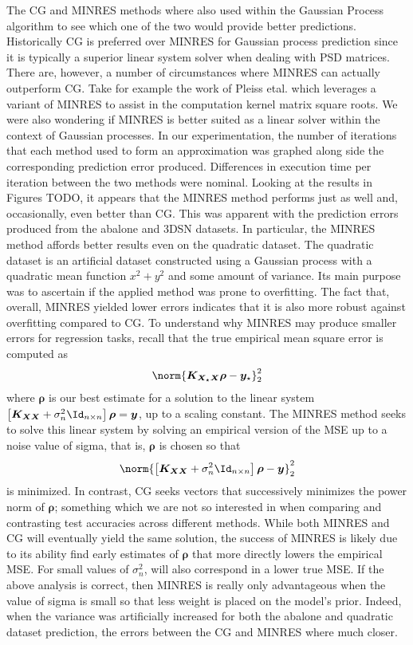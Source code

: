 The CG and MINRES methods where also used within the Gaussian Process algorithm to see which one of the two would provide better predictions. Historically CG is preferred over MINRES for Gaussian process prediction since it is typically a superior linear system solver when dealing with PSD matrices. There are, however, a number of circumstances where MINRES can actually outperform CG. Take for example the work of Pleiss etal. \cite{arxiv200611267} which leverages a variant of MINRES to assist in the computation kernel matrix square roots. We were also wondering if MINRES is better suited as a linear solver within the context of Gaussian processes. In our experimentation, the number of iterations that each method used to form an approximation was graphed along side the corresponding prediction error produced. Differences in execution time per iteration between the two methods were nominal. Looking at the results in Figures TODO, it appears that the MINRES method performs just as well and, occasionally, even better than CG. This was apparent with the prediction errors produced from the abalone and 3DSN datasets. In particular, the MINRES method affords better results even on the quadratic dataset. The quadratic dataset is an artificial dataset constructed using a Gaussian process with a quadratic mean function $x^2 + y^2$ and some amount of variance. Its main purpose was to ascertain if the applied method was prone to overfitting. The fact that, overall, MINRES yielded lower errors indicates that it is also more robust against overfitting compared to CG. To understand why MINRES may produce smaller errors for regression tasks, recall that the true empirical mean square error is computed as
\begin{align*}
    \norm{\bm{K_{X_{\star} X}} \bm{\rho} - \bm{y}_{\star}}_2^2
\end{align*}
where $\bm{\rho}$ is our best estimate for a solution to the linear system $\left[ \bm{K_{XX}} + \sigma_n^2 \Id_{n \times n} \right] \bm{\rho} = \bm{y}$, up to a scaling constant. The MINRES method seeks to solve this linear system by solving an empirical version of the MSE up to a noise value of sigma, that is, $\bm{\rho}$ is chosen so that
\begin{equation*}
    \norm{\left[ \bm{K_{XX}} + \sigma_n^2 \Id_{n \times n} \right] \bm{\rho} - \bm{y}}_2^2
\end{equation*}
is minimized. In contrast, CG seeks vectors that successively minimizes the power norm of $\bm{\rho}$; something which we are not so interested in when comparing and contrasting test accuracies across different methods. While both MINRES and CG will eventually yield the same solution, the success of MINRES is likely due to its ability find early estimates of $\bm{\rho}$ that more directly lowers the empirical MSE. For small values of $\sigma_n^2$, will also correspond in a lower true MSE. If the above analysis is correct, then MINRES is really only advantageous when the value of sigma is small so that less weight is placed on the model's prior. Indeed, when the variance was artificially increased for both the abalone and quadratic dataset prediction, the errors between the CG and MINRES where much closer.

